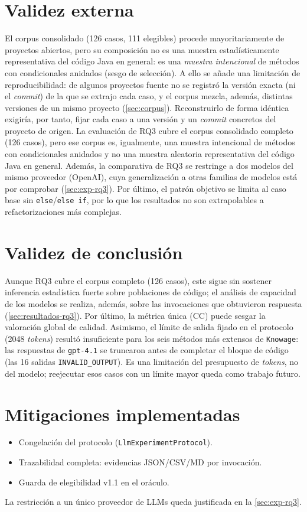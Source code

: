 \section{Validez externa}
El corpus consolidado (126 casos, 111 elegibles) procede mayoritariamente
de proyectos abiertos, pero su composición no es una muestra
estadísticamente representativa del código Java en general: es una
\emph{muestra intencional} de métodos con condicionales anidados (sesgo de
selección). A ello se añade una limitación de reproducibilidad: de algunos proyectos fuente
no se registró la versión exacta (ni el \emph{commit}) de la que se extrajo cada
caso, y el corpus mezcla, además, distintas versiones de un mismo proyecto
(\autoref{sec:corpus}). Reconstruirlo de forma idéntica exigiría, por tanto,
fijar cada caso a una versión y un \emph{commit} concretos del proyecto de
origen. La evaluación de
RQ3 cubre el corpus consolidado completo (126 casos), pero ese corpus es,
igualmente, una muestra intencional de métodos con condicionales anidados y no
una muestra aleatoria representativa del código Java en general. Además, la
comparativa de RQ3 se restringe a dos modelos del mismo proveedor (OpenAI),
cuya generalización a otras familias de modelos está por comprobar
(\autoref{sec:exp-rq3}). Por último, el patrón objetivo se limita al caso base sin
\lstinline|else|/\lstinline|else if|, por lo que los resultados no son
extrapolables a refactorizaciones más complejas.

\section{Validez de conclusión}
Aunque RQ3 cubre el corpus completo (126 casos), este sigue sin sostener
inferencia estadística fuerte sobre poblaciones de código; el análisis de
capacidad de los modelos se realiza, además, sobre las invocaciones que
obtuvieron respuesta (\autoref{sec:resultados-rq3}). Por último, la métrica
única (CC) puede sesgar la valoración global de calidad. Asimismo, el límite de
salida fijado en el protocolo (2048 \emph{tokens}) resultó insuficiente para los
seis métodos más extensos de \texttt{Knowage}: las respuestas de \texttt{gpt-4.1}
se truncaron antes de completar el bloque de código (las 16 salidas
\texttt{INVALID\_OUTPUT}). Es una limitación del presupuesto de \emph{tokens}, no
del modelo; reejecutar esos casos con un límite mayor queda como trabajo futuro.

\section{Mitigaciones implementadas}
\begin{itemize}
  \item Congelación del protocolo (\texttt{LlmExperimentProtocol}).
  \item Trazabilidad completa: evidencias JSON/CSV/MD por invocación.
  \item Guarda de elegibilidad v1.1 en el oráculo.
\end{itemize}
La restricción a un único proveedor de LLMs queda justificada en la
\autoref{sec:exp-rq3}.
